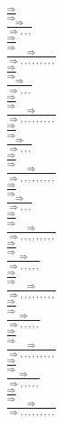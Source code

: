 \documentclass[11pt]{article}
\begin{document}
\begin{center}
\bigskip
\\$\frac{\Rightarrow }{\Rightarrow }$
\bigskip
\\$\frac{\Rightarrow }{\Rightarrow , , , }$
\bigskip
\\$\frac{\Rightarrow }{\Rightarrow }$
\bigskip
\\$\frac{\Rightarrow }{\Rightarrow , , , , , , , , , }$
\bigskip
\\$\frac{\Rightarrow }{\Rightarrow }$
\bigskip
\\$\frac{\Rightarrow }{\Rightarrow , , , }$
\bigskip
\\$\frac{\Rightarrow }{\Rightarrow }$
\bigskip
\\$\frac{\Rightarrow }{\Rightarrow , , , , , , , , , }$
\bigskip
\\$\frac{\Rightarrow }{\Rightarrow }$
\bigskip
\\$\frac{\Rightarrow }{\Rightarrow , , , }$
\bigskip
\\$\frac{\Rightarrow }{\Rightarrow }$
\bigskip
\\$\frac{\Rightarrow }{\Rightarrow , , , , , , , , , }$
\bigskip
\\$\frac{\Rightarrow }{\Rightarrow }$
\bigskip
\\$\frac{\Rightarrow }{\Rightarrow , , , }$
\bigskip
\\$\frac{\Rightarrow }{\Rightarrow }$
\bigskip
\\$\frac{\Rightarrow }{\Rightarrow , , , , , , , , , }$
\bigskip
\\$\frac{\Rightarrow }{\Rightarrow }$
\bigskip
\\$\frac{\Rightarrow }{\Rightarrow , , , , , }$
\bigskip
\\$\frac{\Rightarrow }{\Rightarrow }$
\bigskip
\\$\frac{\Rightarrow }{\Rightarrow , , , , , , , , , }$
\bigskip
\\$\frac{\Rightarrow }{\Rightarrow }$
\bigskip
\\$\frac{\Rightarrow }{\Rightarrow , , , , , }$
\bigskip
\\$\frac{\Rightarrow }{\Rightarrow }$
\bigskip
\\$\frac{\Rightarrow }{\Rightarrow , , , , , , , , , }$
\bigskip
\\$\frac{\Rightarrow }{\Rightarrow }$
\bigskip
\\$\frac{\Rightarrow }{\Rightarrow , , , , , }$
\bigskip
\\$\frac{\Rightarrow }{\Rightarrow }$
\bigskip
\\$\frac{\Rightarrow }{\Rightarrow , , , , , , , , , }$

\end{center}
\end{document}
